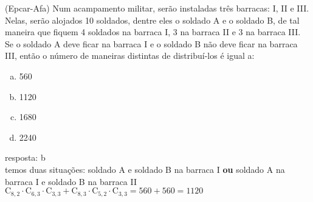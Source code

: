 \begin{ex}
(Epcar-Afa) Num acampamento militar, serão instaladas três barracas: I, II e III. Nelas, serão alojados 10 soldados, dentre eles o soldado A e o soldado B, de tal maneira que fiquem 4 soldados na barraca I, 3 na barraca II e 3 na barraca III.
Se o soldado A deve ficar na barraca I e o soldado B não deve ficar na barraca III, então o número de maneiras distintas de distribuí-los é igual a:
   \begin{enumerate}[(a)]
   \item 560
   \item 1120
   \item 1680
   \item 2240
   \end{enumerate}
     \begin{sol}
      resposta: b \\
      temos duas situações: soldado A e soldado B na barraca I \textbf{ou} soldado A na barraca I e soldado B na barraca II \\
      $\mathrm{C}_{8,2}\cdot\mathrm{C}_{6,3}\cdot\mathrm{C}_{3,3}+\mathrm{C}_{8,3}\cdot\mathrm{C}_{5,2}\cdot\mathrm{C}_{3,3}=560+560=1120$
     \end{sol}
\end{ex}